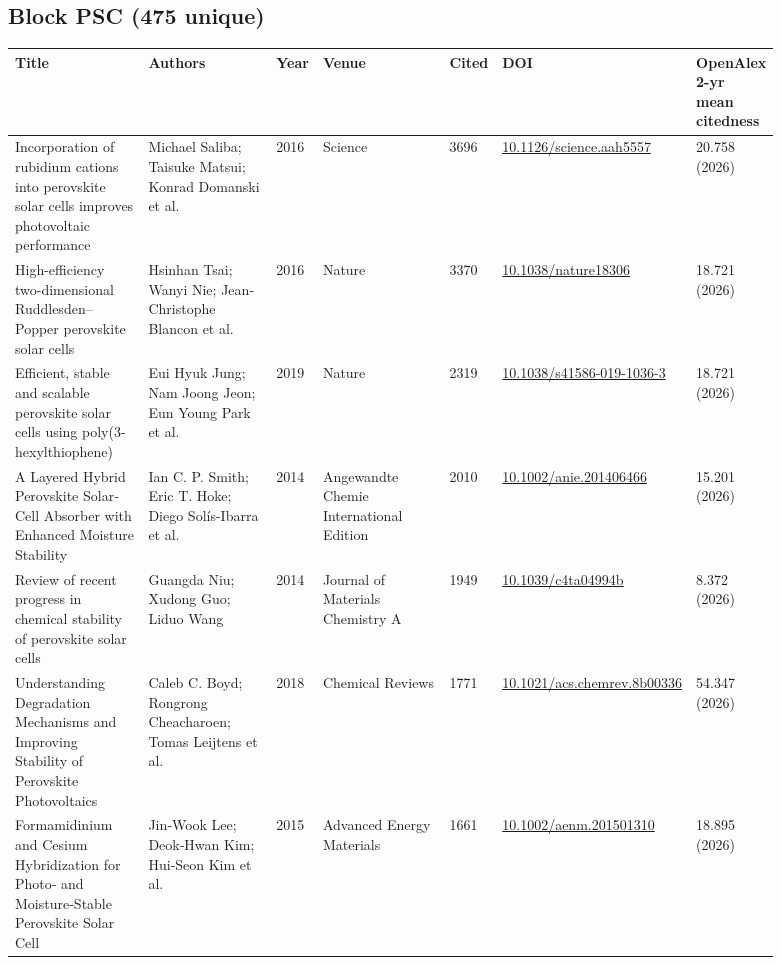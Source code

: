 \documentclass[10pt,a4paper]{article}
\begin{document}
\subsection*{Block PSC (475 unique)}
{\scriptsize\begin{longtable}{p{0.197\linewidth}p{0.197\linewidth}p{0.043\linewidth}p{0.197\linewidth}p{0.043\linewidth}p{0.117\linewidth}p{0.098\linewidth}}
\hline
\textbf{Title} & \textbf{Authors} & \textbf{Year} & \textbf{Venue} & \textbf{Cited} & \textbf{DOI} & \textbf{OpenAlex 2-yr mean citedness} \\ \hline
\endhead
Incorporation of rubidium cations into perovskite solar cells improves photovoltaic performance & Michael Saliba; Taisuke Matsui; Konrad Domanski et al. & 2016 & Science & 3696 & \href{https://doi.org/10.1126/science.aah5557}{10.1126/science.aah5557} & 20.758 (2026) \\
High-efficiency two-dimensional Ruddlesden–Popper perovskite solar cells & Hsinhan Tsai; Wanyi Nie; Jean‐Christophe Blancon et al. & 2016 & Nature & 3370 & \href{https://doi.org/10.1038/nature18306}{10.1038/nature18306} & 18.721 (2026) \\
Efficient, stable and scalable perovskite solar cells using poly(3-hexylthiophene) & Eui Hyuk Jung; Nam Joong Jeon; Eun Young Park et al. & 2019 & Nature & 2319 & \href{https://doi.org/10.1038/s41586-019-1036-3}{10.1038/s41586-019-1036-3} & 18.721 (2026) \\
A Layered Hybrid Perovskite Solar‐Cell Absorber with Enhanced Moisture Stability & Ian C. P. Smith; Eric T. Hoke; Diego Solís-Ibarra et al. & 2014 & Angewandte Chemie International Edition & 2010 & \href{https://doi.org/10.1002/anie.201406466}{10.1002/anie.201406466} & 15.201 (2026) \\
Review of recent progress in chemical stability of perovskite solar cells & Guangda Niu; Xudong Guo; Liduo Wang & 2014 & Journal of Materials Chemistry A & 1949 & \href{https://doi.org/10.1039/c4ta04994b}{10.1039/c4ta04994b} & 8.372 (2026) \\
Understanding Degradation Mechanisms and Improving Stability of Perovskite Photovoltaics & Caleb C. Boyd; Rongrong Cheacharoen; Tomas Leijtens et al. & 2018 & Chemical Reviews & 1771 & \href{https://doi.org/10.1021/acs.chemrev.8b00336}{10.1021/acs.chemrev.8b00336} & 54.347 (2026) \\
Formamidinium and Cesium Hybridization for Photo‐ and Moisture‐Stable Perovskite Solar Cell & Jin‐Wook Lee; Deok‐Hwan Kim; Hui‐Seon Kim et al. & 2015 & Advanced Energy Materials & 1661 & \href{https://doi.org/10.1002/aenm.201501310}{10.1002/aenm.201501310} & 18.895 (2026) \\

\end{longtable}}
\end{document}
